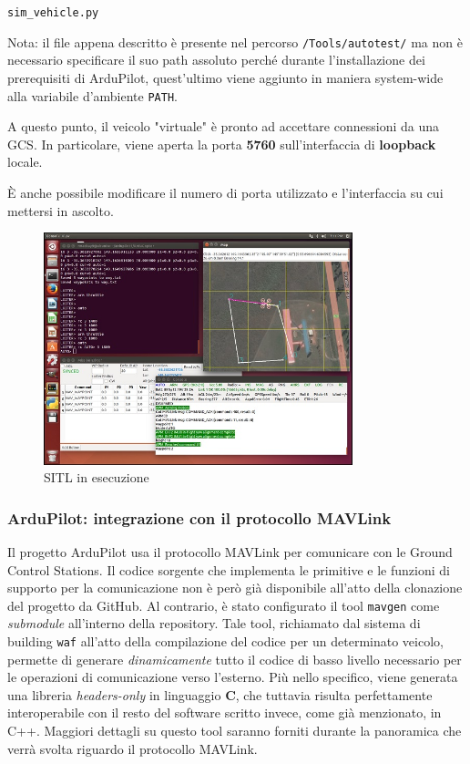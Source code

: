\documentclass[a4paper, 12pt, oneside]{article}
\begin{document}
\begin{center}
    \texttt{sim\_vehicle.py}
\end{center}

Nota: il file appena descritto è presente nel percorso \texttt{/Tools/autotest/} ma non è necessario specificare il suo path assoluto perché durante l'installazione dei prerequisiti di ArduPilot, quest'ultimo viene aggiunto in maniera system-wide alla variabile d'ambiente \texttt{PATH}.

A questo punto, il veicolo "virtuale" è pronto ad accettare connessioni da una GCS. In particolare, viene aperta la porta \textbf{5760} sull'interfaccia di \textbf{loopback} locale.

È anche possibile modificare il numero di porta utilizzato e l'interfaccia su cui mettersi in ascolto.

\begin{figure}[H]
    \centering
    \includegraphics[width=0.8\textwidth]{images/sitl.jpg}
    \caption{SITL in esecuzione}
\end{figure}



\subsubsection{ArduPilot: integrazione con il protocollo MAVLink}
Il progetto ArduPilot usa il protocollo MAVLink per comunicare con le Ground Control Stations. Il codice sorgente che implementa le primitive e le funzioni di supporto per la comunicazione non è però già disponibile all'atto della clonazione del progetto da GitHub. Al contrario, è stato configurato il tool \texttt{mavgen} come \textit{submodule} all'interno della repository. Tale tool, richiamato dal sistema di building \texttt{waf} all'atto della compilazione del codice per un determinato veicolo, permette di generare \textit{dinamicamente} tutto il codice di basso livello necessario per le operazioni di comunicazione verso l'esterno\cite{mavgen}. Più nello specifico, viene generata una libreria \textit{headers-only} in linguaggio \textbf{C}, che tuttavia risulta perfettamente interoperabile con il resto del software scritto invece, come già menzionato, in C++. Maggiori dettagli su questo tool saranno forniti durante la panoramica che verrà svolta riguardo il protocollo MAVLink.
\end{document}
